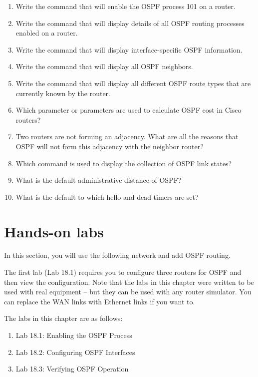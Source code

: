 \begin{enumerate}
\item
  Write the command that will enable the OSPF process 101 on a router.
\item
  Write the command that will display details of all OSPF routing
  processes enabled on a router.
\item
  Write the command that will display interface-specific OSPF
  information.
\item
  Write the command that will display all OSPF neighbors.
\item
  Write the command that will display all different OSPF route types
  that are currently known by the router.
\item
  Which parameter or parameters are used to calculate OSPF cost in Cisco
  routers?
\item
  Two routers are not forming an adjacency. What are all the reasons
  that OSPF will not form this adjacency with the neighbor router?
\item
  Which command is used to display the collection of OSPF link states?
\item
  What is the default administrative distance of OSPF?
\item
  What is the default to which hello and dead timers are set?
\end{enumerate}



\section{Hands-on labs}

In this section, you will use the following network and add OSPF
routing.

\begin{figure}
\centering
\caption{}
\end{figure}

\protect\hypertarget{c18.xhtmlux5cux23Page_773}{}{}The first lab (Lab
18.1) requires you to configure three routers for OSPF and then view the
configuration. Note that the labs in this chapter were written to be
used with real equipment -- but they can be used with any router
simulator. You can replace the WAN links with Ethernet links if you want
to.

The labs in this chapter are as follows:

\begin{enumerate}
\item
  Lab 18.1: Enabling the OSPF Process
\item
  Lab 18.2: Configuring OSPF Interfaces
\item
  Lab 18.3: Verifying OSPF Operation
\end{enumerate}

